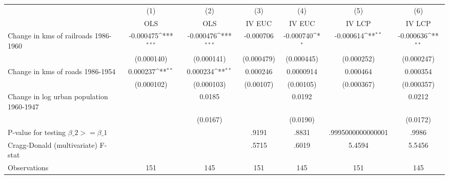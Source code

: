 {
\def\sym#1{\ifmmode^{#1}\else\(^{#1}\)\fi}
\begin{tabular}{l*{6}{c}}
\hline\hline
                &\multicolumn{1}{c}{(1)}&\multicolumn{1}{c}{(2)}&\multicolumn{1}{c}{(3)}&\multicolumn{1}{c}{(4)}&\multicolumn{1}{c}{(5)}&\multicolumn{1}{c}{(6)}\\
                &\multicolumn{1}{c}{OLS}&\multicolumn{1}{c}{OLS}&\multicolumn{1}{c}{IV EUC}&\multicolumn{1}{c}{IV EUC}&\multicolumn{1}{c}{IV LCP}&\multicolumn{1}{c}{IV LCP}\\
\hline
Change in kms of railroads 1986-1960&-0.000475\sym{***}&-0.000476\sym{***}&-0.000706         &-0.000740\sym{*}  &-0.000614\sym{**} &-0.000636\sym{**} \\
                &(0.000140)         &(0.000141)         &(0.000479)         &(0.000445)         &(0.000252)         &(0.000247)         \\
[1em]
Change in kms of roads 1986-1954& 0.000237\sym{**} & 0.000234\sym{**} & 0.000246         &0.0000914         & 0.000464         & 0.000354         \\
                &(0.000102)         &(0.000103)         &(0.00107)         &(0.00105)         &(0.000367)         &(0.000357)         \\
[1em]
Change in log urban population 1960-1947&                  &   0.0185         &                  &   0.0192         &                  &   0.0212         \\
                &                  & (0.0167)         &                  & (0.0190)         &                  & (0.0172)         \\
\hline
P-value for testing $\beta\_{2} >= \beta\_{1}$&                  &                  &    .9191         &    .8831         &.9995000000000001         &    .9986         \\
Cragg-Donald (multivariate) F-stat&                  &                  &    .5715         &    .6019         &   5.4594         &   5.5456         \\
Observations    &      151         &      145         &      151         &      145         &      151         &      145         \\
\hline\hline
\end{tabular}
}
